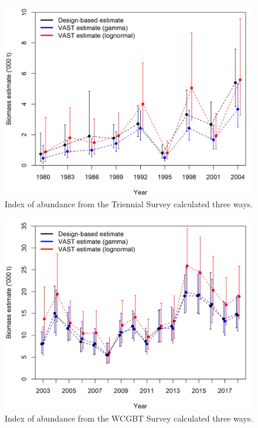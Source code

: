 \documentclass[]{article}
\begin{document}
\begin{figure}
\centering
\includegraphics{Figures/Triennial_index_compare.png}
\caption{Index of abundance from the Triennial Survey calculated three
ways.\label{fig:Triennial_index_compare}}
\end{figure}

\begin{figure}
\centering
\includegraphics{Figures/WCGBTS_index_compare.png}
\caption{Index of abundance from the WCGBT Survey calculated three
ways.\label{fig:WCGBTS_index_compare}}
\end{figure}
\end{document}
